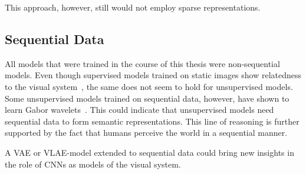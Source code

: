 This approach, however, still would not employ sparse representations.

\subsection{Sequential Data}\label{subsec:sequential-data}

All models that were trained in the course of this thesis were non-sequential models.
Even though supervised models trained on static images show relatedness to the visual system~\citep{khaligh2014deep,cadieu2014deep,krizhevsky2012imagenet}, the same does not seem to hold for unsupervised models.
Some unsupervised models trained on sequential data, however, have shown to learn Gabor wavelets~\citep{berkes2005slow,palm2012prediction}.
This could indicate that unsupervised models need sequential data to form semantic representations.
This line of reasoning is further supported by the fact that humans perceive the world in a sequential manner.

A \ac{VAE} or \ac{VLAE}-model extended to sequential data could bring new insights in the role of \acp{CNN} as models of the visual system.